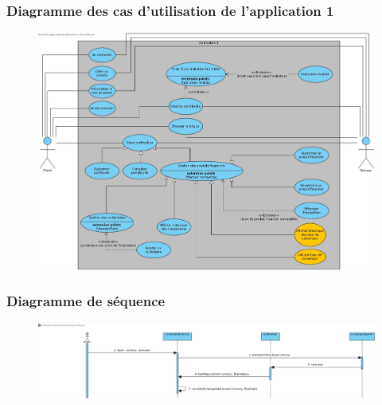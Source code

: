 \documentclass[../rapport.tex]{subfiles}
\begin{document}
\subsubsection{Diagramme des cas d'utilisation de l'application 1}
\begin{figure}[H]
    \includegraphics[scale=0.288]{ressources/photos_diagrammes/extensionUgo/useCaseApp1.jpg}
    \caption{}
\end{figure}

\subsubsection{Diagramme de séquence}
\begin{figure}[H]
    \includegraphics[scale=0.288]{ressources/photos_diagrammes/extensionUgo/calculateExchangeRate.jpg}
\end{figure}
\end{document}
